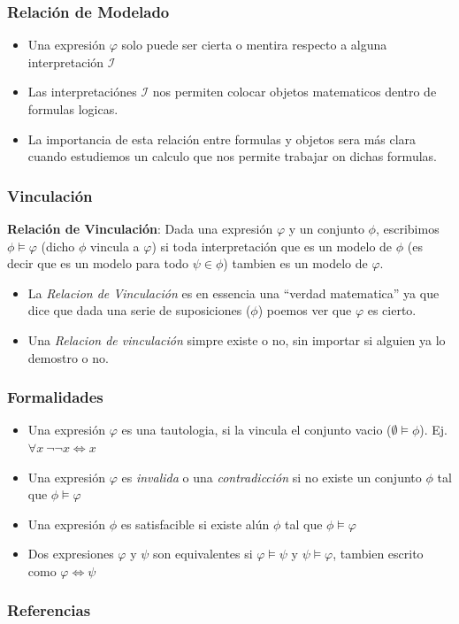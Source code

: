 \documentclass{beamer}
\begin{document}
\begin{frame}
    \frametitle{Relaci\'on de Modelado}
    \begin{itemize}
        \item{Una expresi\'on $\varphi$ solo puede ser cierta o mentira
            respecto a alguna interpretaci\'on $\mathcal{I}$}
        \item{Las interpretaci\'ones $\mathcal{I}$ nos permiten colocar
            objetos matematicos dentro de formulas logicas.}
        \item{La importancia de esta relaci\'on entre formulas y objetos
            sera m\'as clara cuando estudiemos un calculo que nos permite
            trabajar on dichas formulas.}
    \end{itemize}
\end{frame}

\begin{frame}
    \frametitle{Vinculaci\'on}
    {\bf Relaci\'on de Vinculaci\'on}: Dada una expresi\'on $\varphi$ y
    un conjunto $\phi$, escribimos $\phi\models\varphi$ (dicho $\phi$
    vincula a $\varphi$) si toda interpretaci\'on que es un modelo
    de $\phi$ (es decir que es un modelo para todo $\psi\in\phi$)
    tambien es un modelo de $\varphi$.
    \\\vspace{1cm}
    \begin{itemize}
        \item{La \emph{Relacion de Vinculaci\'on} es en essencia una ``verdad matematica''
            ya que dice que dada una serie de suposiciones ($\phi$) poemos ver que
            $\varphi$ es cierto.}
        \item{Una \emph{Relacion de vinculaci\'on} simpre existe o no, sin importar
            si alguien ya lo demostro o no.}
    \end{itemize}
\end{frame}

\begin{frame}
    \frametitle{Formalidades}
    \begin{itemize}
        \item{Una expresi\'on $\varphi$ es una tautologia, si la
        vincula el conjunto vacio ($\emptyset\models\phi$). Ej.
        $\forall x\ \neg\neg x \Leftrightarrow x$}
        \item{Una expresi\'on $\varphi$ es \emph{invalida} o una \emph{contradicci\'on}
            si no existe un conjunto $\phi$ tal que $\phi\models\varphi$}
        \item{Una expresi\'on $\phi$ es satisfacible si existe al\'un $\phi$
            tal que $\phi\models\varphi$}
        \item{Dos expresiones $\varphi$ y $\psi$ son equivalentes si $\varphi\models\psi$
            y $\psi\models\varphi$, tambien escrito como $\varphi\Leftrightarrow\psi$}
    \end{itemize}
\end{frame}

\begin{frame}
    \frametitle{Referencias}
    
    
\end{frame}
\end{document}
